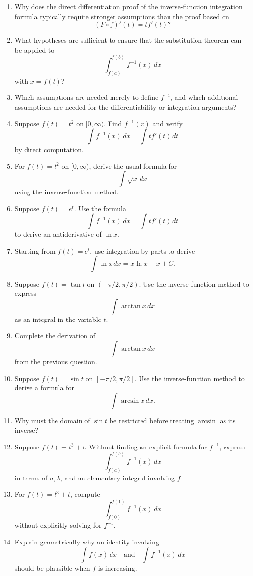 \begin{enumerate}
  \item Why does the direct differentiation proof of the inverse-function integration formula typically require stronger assumptions than the proof based on
    \[ (F\circ f)'(t)=t f'(t)? \]
  \item What hypotheses are sufficient to ensure that the substitution theorem can be applied to
    \[ \int_{f(a)}^{f(b)}f^{-1}(x)\,dx \]
    with \(x=f(t)\)?
  \item Which assumptions are needed merely to define \(f^{-1}\), and which additional assumptions are needed for the differentiability or integration arguments?
  \item Suppose \(f(t)=t^{2}\) on \([0,\infty)\). Find \(f^{-1}(x)\) and verify
    \[ \int f^{-1}(x)\,dx = \int t f'(t)\,dt \]
    by direct computation.
  \item For \(f(t)=t^{2}\) on \([0,\infty)\), derive the usual formula for
    \[ \int \sqrt{x}\,dx \]
    using the inverse-function method.
  \item Suppose \(f(t)=e^{t}\). Use the formula
    \[ \int f^{-1}(x)\,dx = \int t f'(t)\,dt \]
    to derive an antiderivative of \(\ln x\).
  \item Starting from \(f(t)=e^{t}\), use integration by parts to derive
    \[ \int \ln x\,dx=x\ln x-x+C. \]
  \item Suppose \(f(t)=\tan t\) on \((-\pi/2,\pi/2)\). Use the inverse-function method to express
    \[ \int \arctan x\,dx \]
    as an integral in the variable \(t\).
  \item Complete the derivation of
    \[ \int \arctan x\,dx \]
    from the previous question.
  \item Suppose \(f(t)=\sin t\) on \([-\pi/2,\pi/2]\). Use the inverse-function method to derive a formula for
    \[ \int \arcsin x\,dx. \]
  \item Why must the domain of \(\sin t\) be restricted before treating \(\arcsin\) as its inverse?
  \item Suppose \(f(t)=t^{3}+t\). Without finding an explicit formula for \(f^{-1}\), express
    \[ \int_{f(a)}^{f(b)}f^{-1}(x)\,dx \]
    in terms of \(a\), \(b\), and an elementary integral involving \(f\).
  \item For \(f(t)=t^{3}+t\), compute
    \[ \int_{f(0)}^{f(1)}f^{-1}(x)\,dx \]
    without explicitly solving for \(f^{-1}\).
  \item Explain geometrically why an identity involving
    \[ \int f(x)\,dx \quad\text{and}\quad \int f^{-1}(x)\,dx \]
    should be plausible when \(f\) is increasing.

\end{enumerate}
